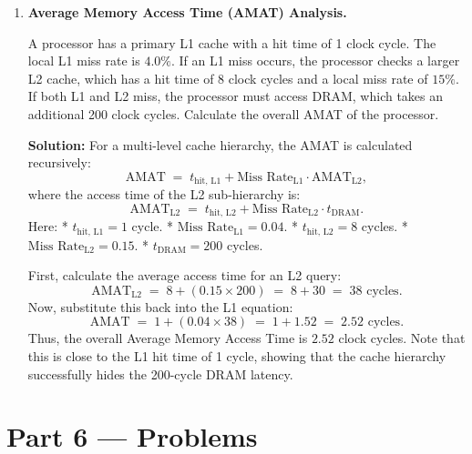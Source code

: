 \documentclass[12pt, a4paper]{book}
\begin{document}
\begin{problembox}
\begin{enumerate}[label=\textbf{E\arabic*.}]
  \item \textbf{Average Memory Access Time (AMAT) Analysis.}
  
        A processor has a primary L1 cache with a hit time of 1 clock cycle.
        The local L1 miss rate is $4.0\%$.
        If an L1 miss occurs, the processor checks a larger L2 cache, which has a hit time of 8 clock cycles and a local miss rate of $15\%$.
        If both L1 and L2 miss, the processor must access DRAM, which takes an additional 200 clock cycles.
        Calculate the overall AMAT of the processor.
        
        \textbf{Solution:}
        For a multi-level cache hierarchy, the AMAT is calculated recursively:
        \[
          \text{AMAT} \;=\; t_{\text{hit, L1}} + \text{Miss Rate}_{\text{L1}} \cdot \text{AMAT}_{\text{L2}},
        \]
        where the access time of the L2 sub-hierarchy is:
        \[
          \text{AMAT}_{\text{L2}} \;=\; t_{\text{hit, L2}} + \text{Miss Rate}_{\text{L2}} \cdot t_{\text{DRAM}}.
        \]
        Here:
        * $t_{\text{hit, L1}} = 1$ cycle.
        * $\text{Miss Rate}_{\text{L1}} = 0.04$.
        * $t_{\text{hit, L2}} = 8$ cycles.
        * $\text{Miss Rate}_{\text{L2}} = 0.15$.
        * $t_{\text{DRAM}} = 200$ cycles.
        
        First, calculate the average access time for an L2 query:
        \[
          \text{AMAT}_{\text{L2}} \;=\; 8 + (0.15 \times 200) \;=\; 8 + 30 \;=\; 38 \text{ cycles}.
        \]
        Now, substitute this back into the L1 equation:
        \[
          \text{AMAT} \;=\; 1 + (0.04 \times 38) \;=\; 1 + 1.52 \;=\; 2.52 \text{ cycles}.
        \]
        Thus, the overall Average Memory Access Time is $2.52$ clock cycles.
        Note that this is close to the L1 hit time of 1 cycle, showing that the cache hierarchy successfully hides the 200-cycle DRAM latency.
\end{enumerate}
\end{problembox}

\newpage

\section{Part 6 --- Problems}
\end{document}
